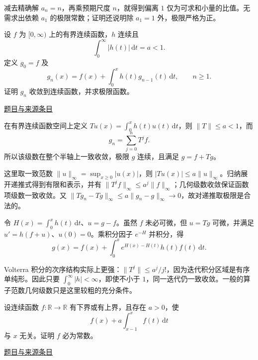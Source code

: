 \documentclass[UTF8,12pt,a4paper,fontset=fandol]{ctexart}
\begin{document}
\begin{remark}[方法与条件]减去精确解 $a_n=n$，再乘预期尺度 $n$，就得到偏离 $1$ 仅为可求和小量的比值。无需求出依赖 $a_1$ 的极限常数；证明还说明除 $a_1=1$ 外，极限严格为正。\end{remark}

\begin{example}[来源序号5]\label{ex:pre07-math:5}\label{pr:pre07-math:5}

设 $f$ 为 $[0,\infty)$ 上的有界连续函数，$h$ 连续且
\[
\int_0^\infty|h(t)|\,\mathrm dt=a<1.
\]
定义 $g_0=f$ 及
\[
g_n(x)=f(x)+\int_0^xh(t)g_{n-1}(t)\,\mathrm dt,\qquad n\ge1.
\]
证明 $g_n$ 收敛到连续函数，并求极限函数。

\par\href{https://github.com/lzxcr/cmc-mathematics/blob/64916fa1fdbc3e444a652eca204d5669058ee321/src/problems/preliminary/07/05.md}{题目与来源条目}

\end{example}

\begin{solve}\label{ans:pre07-math:5}

在有界连续函数空间上定义 $Tu(x)=\int_0^xh(t)u(t)\,\mathrm dt$，则 $\|T\|\le a<1$，而
\[
g_n=\sum_{j=0}^nT^jf.
\]
所以该级数在整个半轴上一致收敛，极限 $g$ 连续，且满足 $g=f+Tg$。

这里取一致范数 $\|u\|_\infty=\sup_{x\ge0}|u(x)|$，则 $|Tu(x)|\le a\|u\|_\infty$。归纳展开递推式得到有限和表示，并有 $\|T^jf\|_\infty\le a^j\|f\|_\infty$；几何级数收敛保证函数项级数一致收敛。又 $\|Tg_n-Tg\|_\infty\le a\|g_n-g\|_\infty\to0$，故对递推取极限是合法的。

令 $H(x)=\int_0^xh(t)\,\mathrm dt$、$u=g-f$。虽然 $f$ 未必可微，但 $u=Tg$ 可微，并满足 $u'=h(f+u)$、$u(0)=0$。乘积分因子 $e^{-H}$ 并积分，得
\[
\boxed{g(x)=f(x)+\int_0^xe^{H(x)-H(t)}h(t)f(t)\,\mathrm dt}.
\]

\end{solve}

\begin{remark}[方法与条件]Volterra 积分的次序结构实际上更强：$\|T^j\|\le a^j/j!$，因为迭代积分区域是有序单纯形。因此只要 $\int_0^\infty|h|<\infty$，即使不小于 $1$，同一迭代仍一致收敛。一般的算子范数几何级数只是这里较粗的充分条件。\end{remark}

\begin{example}[来源序号6]\label{ex:pre07-math:6}\label{pr:pre07-math:6}

设连续函数 $f:\mathbb R\to\mathbb R$ 有下界或有上界，且存在 $a>0$，使
\[
f(x)+a\int_{x-1}^xf(t)\,\mathrm dt
\]
与 $x$ 无关。证明 $f$ 必为常数。

\par\href{https://github.com/lzxcr/cmc-mathematics/blob/64916fa1fdbc3e444a652eca204d5669058ee321/src/problems/preliminary/07/06.md}{题目与来源条目}

\end{example}
\end{document}
